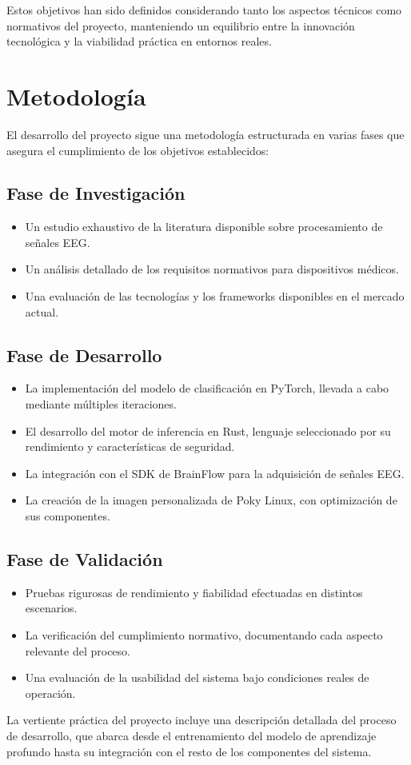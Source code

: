 Estos objetivos han sido definidos considerando tanto los aspectos técnicos como normativos del proyecto, manteniendo un equilibrio entre la innovación tecnológica y la viabilidad práctica en entornos reales.

\newpage
\section{Metodología}
El desarrollo del proyecto sigue una metodología estructurada en varias fases que asegura el cumplimiento de los objetivos establecidos:

\subsection{Fase de Investigación}
\begin{itemize}
    \item Un estudio exhaustivo de la literatura disponible sobre procesamiento de señales EEG.
    \item Un análisis detallado de los requisitos normativos para dispositivos médicos.
    \item Una evaluación de las tecnologías y los frameworks disponibles en el mercado actual.
\end{itemize}

\subsection{Fase de Desarrollo}
\begin{itemize}
    \item La implementación del modelo de clasificación en PyTorch, llevada a cabo mediante múltiples iteraciones.
    \item El desarrollo del motor de inferencia en Rust, lenguaje seleccionado por su rendimiento y características de seguridad.
    \item La integración con el SDK de BrainFlow para la adquisición de señales EEG.
    \item La creación de la imagen personalizada de Poky Linux, con optimización de sus componentes.
\end{itemize}

\subsection{Fase de Validación}
\begin{itemize}
    \item Pruebas rigurosas de rendimiento y fiabilidad efectuadas en distintos escenarios.
    \item La verificación del cumplimiento normativo, documentando cada aspecto relevante del proceso.
    \item Una evaluación de la usabilidad del sistema bajo condiciones reales de operación.
\end{itemize}

La vertiente práctica del proyecto incluye una descripción detallada del proceso de desarrollo, que abarca desde el entrenamiento del modelo de aprendizaje profundo hasta su integración con el resto de los componentes del sistema.
